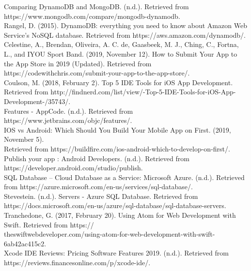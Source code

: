 \documentclass[letterpaper,10pt,draftclsnofoot,onecolumn,compsoc]{IEEEtran}
\begin{document}
Comparing DynamoDB and MongoDB. (n.d.). Retrieved from https://www.mongodb.com/compare/mongodb-dynamodb.\\ 

Rangel, D. (2015). DynamoDB: everything you need to know about Amazon Web Service's NoSQL database. Retrieved from https://aws.amazon.com/dynamodb/.\\ 

Celestine, A., Brendan, Oliveira, A. C. de, Gaasbeek, M. J., Ching, C., Fortna, L., and IYOU Sport Band. (2019, November 12). How to Submit Your App to the App Store in 2019 (Updated). Retrieved from https://codewithchris.com/submit-your-app-to-the-app-store/.\\ 

Coulson, M. (2018, February 2). Top 5 IDE Tools for iOS App Development. Retrieved from http://findnerd.com/list/view/-Top-5-IDE-Tools-for-iOS-App-Development-/35743/.\\ 

Features - AppCode. (n.d.). Retrieved from https://www.jetbrains.com/objc/features/.\\ 

IOS vs Android: Which Should You Build Your Mobile App on First. (2019, November 5). \\Retrieved from https://buildfire.com/ios-android-which-to-develop-on-first/.\\ 

Publish your app  :   Android Developers. (n.d.). Retrieved from https://developer.android.com/studio/publish.\\ 

SQL Database – Cloud Database as a Service: Microsoft Azure. (n.d.). Retrieved from https://azure.microsoft.com/en-us/services/sql-database/.\\ 

Stevestein. (n.d.). Servers - Azure SQL Database. Retrieved from https://docs.microsoft.com/en-us/azure/sql-database/sql-database-servers.\\ 

Tranchedone, G. (2017, February 20). Using Atom for Web Development with Swift. Retrieved from https://\\theswiftwebdeveloper.com/using-atom-for-web-development-with-swift-6ab42ac415c2.\\ 

Xcode IDE Reviews: Pricing Software Features 2019. (n.d.). Retrieved from https://reviews.financesonline.com/p/xcode-ide/.

\vfill
\end{document}

